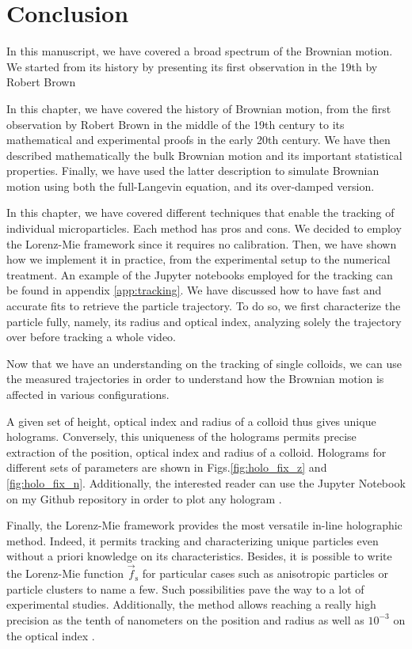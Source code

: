 \section{Conclusion}

In this manuscript, we have covered a broad spectrum of the Brownian motion. We started from its history by presenting its first observation in the 19th by Robert Brown 

In this chapter, we have covered the history of Brownian motion, from the first observation by Robert Brown in the middle of the 19th century to its mathematical and experimental proofs in the early 20th century. We have then described mathematically the bulk Brownian motion and its important statistical properties. Finally, we have used the latter description to simulate Brownian motion using both the full-Langevin equation, and its over-damped version. 


In this chapter, we have covered different techniques that enable the tracking of individual microparticles. Each method has pros and cons. We decided to employ the Lorenz-Mie framework since it requires no calibration. Then, we have shown how we implement it in practice, from the experimental setup to the numerical treatment. An example of the Jupyter notebooks employed for the tracking can be found in appendix \ref{app:tracking}.  We have discussed how to have fast and accurate fits to retrieve the particle trajectory. To do so, we first characterize the particle fully, namely, its radius and optical index, analyzing solely the trajectory over before tracking a whole video. 

Now that we have an understanding on the tracking of single colloids, we can use the measured trajectories in order to understand how the Brownian motion is affected in various configurations. 

A given set of height, optical index and radius of a colloid thus gives unique holograms. Conversely, this uniqueness of the holograms permits precise extraction of the position, optical index and radius of a colloid. Holograms for different sets of parameters are shown in Figs.\ref{fig:holo_fix_z} and \ref{fig:holo_fix_n}. Additionally, the interested reader can use  the Jupyter Notebook on my Github repository in order to plot any hologram \href{https://github.com/eXpensia/Ma-these/blob/main/02_body/chapter2/images/holo_size_exemple/holosize_variation.ipynb}{\faGithub}.  

Finally, the Lorenz-Mie framework provides the most versatile in-line holographic method. Indeed, it permits tracking and characterizing unique particles even without a priori knowledge on its characteristics. Besides, it is possible to write the Lorenz-Mie function $\vec{f}_\mathrm{s}$ for particular cases such as anisotropic particles \cite{fung_holographic_2013, wang_using_2014} or particle clusters \cite{fung_holographic_2013, perry_real-space_2013} to name a few. Such possibilities pave the way to a lot of experimental studies. Additionally, the method allows reaching a really high precision as the tenth of nanometers on the position and radius as well as $10^{-3}$ on the optical index \cite{lee_characterizing_2007}. 

